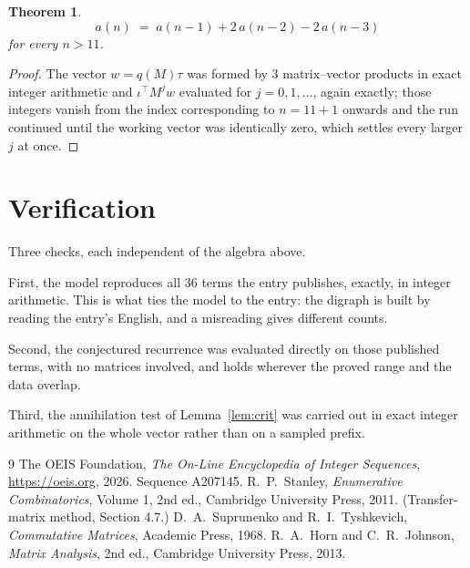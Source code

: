 \documentclass[11pt,a4paper]{article}
\theoremstyle{plain}
\newtheorem{theorem}{Theorem}
\theoremstyle{definition}
\begin{document}
\begin{theorem}
\[
a(n)\;=\;a(n-1) + 2\,a(n-2) - 2\,a(n-3)
\]
for every $n>11$.
\end{theorem}

\begin{proof}
The vector $w=q(M)\tau$ was formed by $3$ matrix--vector products in exact integer
arithmetic and $\iota^{\!\top}M^{j}w$ evaluated for $j=0,1,\dots$, again exactly; those
integers vanish from the index corresponding to $n=11+1$ onwards and the run continued
until the working vector was identically zero, which settles every larger $j$ at once.
\end{proof}

\section{Verification}

Three checks, each independent of the algebra above.

First, the model reproduces all $36$ terms the entry publishes, exactly, in integer
arithmetic. This is what ties the model to the entry: the digraph is built by reading the
entry's English, and a misreading gives different counts.

Second, the conjectured recurrence was evaluated directly on those published terms, with no
matrices involved, and holds wherever the proved range and the data overlap.

Third, the annihilation test of Lemma~\ref{lem:crit} was carried out in exact integer
arithmetic on the whole vector rather than on a sampled prefix.

\begin{thebibliography}{9}
 The OEIS Foundation, \emph{The On-Line Encyclopedia of Integer
Sequences}, \url{https://oeis.org}, 2026. Sequence A207145.
 R.~P.~Stanley, \emph{Enumerative Combinatorics}, Volume 1, 2nd ed.,
Cambridge University Press, 2011. (Transfer-matrix method, Section 4.7.)
 D.~A.~Suprunenko and R.~I.~Tyshkevich, \emph{Commutative Matrices},
Academic Press, 1968.
 R.~A.~Horn and C.~R.~Johnson, \emph{Matrix Analysis}, 2nd ed., Cambridge
University Press, 2013.
\end{thebibliography}
\end{document}
